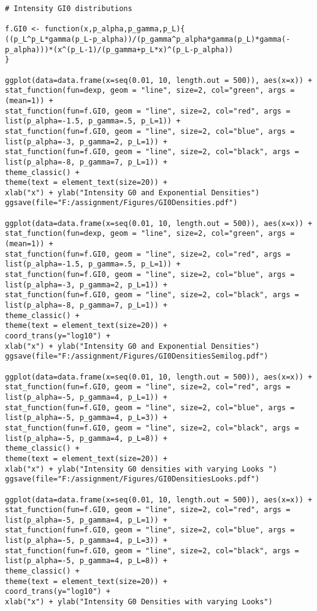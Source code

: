 \documentclass{article}
\begin{document}
\begin{lstlisting}
# Intensity GI0 distributions

f.GI0 <- function(x,p_alpha,p_gamma,p_L){
((p_L^p_L*gamma(p_L-p_alpha))/(p_gamma^p_alpha*gamma(p_L)*gamma(-p_alpha)))*(x^(p_L-1)/(p_gamma+p_L*x)^(p_L-p_alpha))
}

ggplot(data=data.frame(x=seq(0.01, 10, length.out = 500)), aes(x=x)) +
stat_function(fun=dexp, geom = "line", size=2, col="green", args = (mean=1)) +
stat_function(fun=f.GI0, geom = "line", size=2, col="red", args = list(p_alpha=-1.5, p_gamma=.5, p_L=1)) +
stat_function(fun=f.GI0, geom = "line", size=2, col="blue", args = list(p_alpha=-3, p_gamma=2, p_L=1)) +
stat_function(fun=f.GI0, geom = "line", size=2, col="black", args = list(p_alpha=-8, p_gamma=7, p_L=1)) +
theme_classic() +
theme(text = element_text(size=20)) +
xlab("x") + ylab("Intensity G0 and Exponential Densities")
ggsave(file="F:/assignment/Figures/GI0Densities.pdf")  

ggplot(data=data.frame(x=seq(0.01, 10, length.out = 500)), aes(x=x)) +
stat_function(fun=dexp, geom = "line", size=2, col="green", args = (mean=1)) +
stat_function(fun=f.GI0, geom = "line", size=2, col="red", args = list(p_alpha=-1.5, p_gamma=.5, p_L=1)) +
stat_function(fun=f.GI0, geom = "line", size=2, col="blue", args = list(p_alpha=-3, p_gamma=2, p_L=1)) +
stat_function(fun=f.GI0, geom = "line", size=2, col="black", args = list(p_alpha=-8, p_gamma=7, p_L=1)) +
theme_classic() +
theme(text = element_text(size=20)) +
coord_trans(y="log10") +
xlab("x") + ylab("Intensity G0 and Exponential Densities")
ggsave(file="F:/assignment/Figures/GI0DensitiesSemilog.pdf")  

ggplot(data=data.frame(x=seq(0.01, 10, length.out = 500)), aes(x=x)) +
stat_function(fun=f.GI0, geom = "line", size=2, col="red", args = list(p_alpha=-5, p_gamma=4, p_L=1)) +
stat_function(fun=f.GI0, geom = "line", size=2, col="blue", args = list(p_alpha=-5, p_gamma=4, p_L=3)) +
stat_function(fun=f.GI0, geom = "line", size=2, col="black", args = list(p_alpha=-5, p_gamma=4, p_L=8)) +
theme_classic() +
theme(text = element_text(size=20)) +
xlab("x") + ylab("Intensity G0 densities with varying Looks ")
ggsave(file="F:/assignment/Figures/GI0DensitiesLooks.pdf")  

ggplot(data=data.frame(x=seq(0.01, 10, length.out = 500)), aes(x=x)) +
stat_function(fun=f.GI0, geom = "line", size=2, col="red", args = list(p_alpha=-5, p_gamma=4, p_L=1)) +
stat_function(fun=f.GI0, geom = "line", size=2, col="blue", args = list(p_alpha=-5, p_gamma=4, p_L=3)) +
stat_function(fun=f.GI0, geom = "line", size=2, col="black", args = list(p_alpha=-5, p_gamma=4, p_L=8)) +
theme_classic() +
theme(text = element_text(size=20)) +
coord_trans(y="log10") +
xlab("x") + ylab("Intensity G0 Densities with varying Looks") 
\end{lstlisting}
\end{document}
